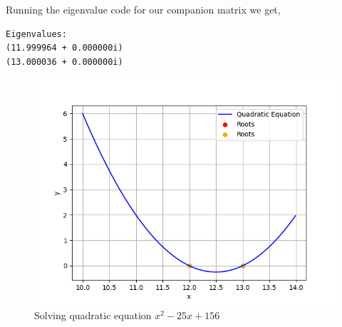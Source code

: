 \documentclass[journal]{IEEEtran}
\begin{document}
Running the eigenvalue code for our companion matrix we get,
\begin{verbatim}
Eigenvalues:
(11.999964 + 0.000000i) 
(13.000036 + 0.000000i)\end{verbatim}
\begin{figure}[h!]
   \centering
   \includegraphics[width=1\columnwidth]{figs/fig.png}
   \caption{Solving quadratic equation $x^2 - 25x + 156$}
   \label{stemplot}
\end{figure}
\end{document}

